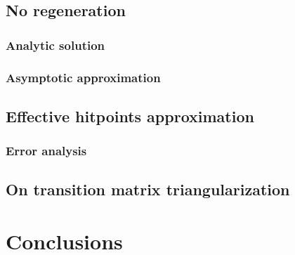 	\subsection{No regeneration}\label{chap:noregen}
	
		\subsubsection{Analytic solution}\label{chap:noregenSolution}
		
		\subsubsection{Asymptotic approximation}\label{chap:noregenAsymptotics}
		
	\subsection{Effective hitpoints approximation}\label{chap:effhp}
	
		\subsubsection{Error analysis}
		
	\subsection{On transition matrix triangularization}\label{chap:otherApproximations}
	
\pagebreak

%	
%
\section{Conclusions}\label{chap:conclusions}
	





